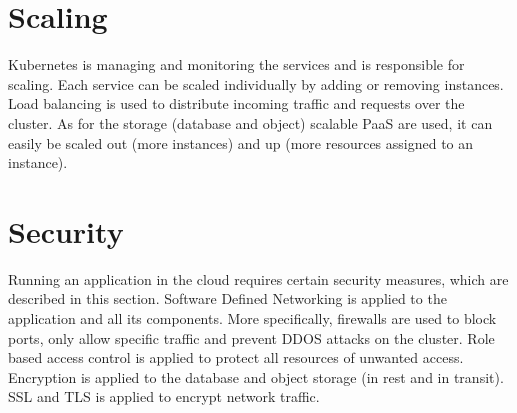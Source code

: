 \documentclass[conference]{IEEEtran}
\begin{document}
\section{Scaling}
Kubernetes is managing and monitoring the services and is responsible for scaling. Each service can be
scaled individually by adding or removing instances. \\
Load balancing is used to distribute incoming traffic and requests over the cluster.
As for the storage (database and object) scalable PaaS are used, it can easily be scaled out (more instances)
and up (more resources assigned to an instance).

\section{Security}
Running an application in the cloud requires certain security measures, which are described in this section.
Software Defined Networking is applied to the application and all its components. More specifically,
firewalls are used to block ports, only allow specific traffic and prevent DDOS attacks on the cluster.
Role based access control is applied to protect all resources of unwanted access. \\
Encryption is applied to the database and object storage (in rest and in transit). SSL and TLS is
applied to encrypt network traffic.
\end{document}
